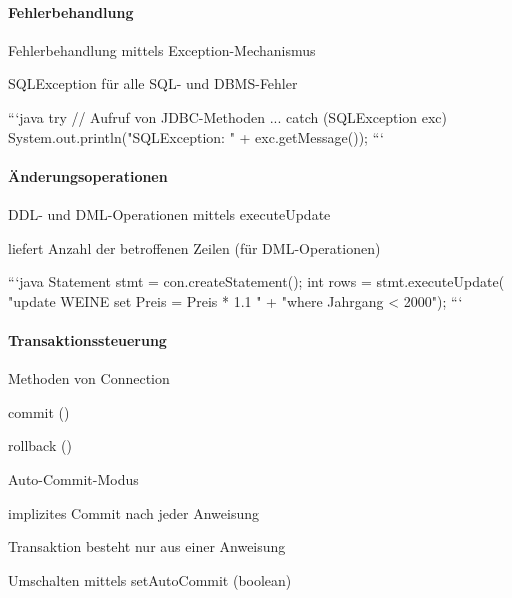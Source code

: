 \documentclass[a4paper]{article}
\begin{document}
\begin{multicols}{3}
    \paragraph{Fehlerbehandlung}
    \begin{itemize*}
        \item Fehlerbehandlung mittels Exception-Mechanismus
        \item SQLException für alle SQL- und DBMS-Fehler
    \end{itemize*}
    ```java
    try {
            // Aufruf von JDBC-Methoden
            ...
        } catch (SQLException exc) {
            System.out.println("SQLException: " +
            exc.getMessage());
        }
    ```

    \paragraph{Änderungsoperationen}
    \begin{itemize*}
        \item DDL- und DML-Operationen mittels executeUpdate
        \item liefert Anzahl der betroffenen Zeilen (für DML-Operationen)
    \end{itemize*}
    ```java
    Statement stmt = con.createStatement();
    int rows = stmt.executeUpdate(
    "update WEINE set Preis = Preis * 1.1 " +
    "where Jahrgang < 2000");
    ```

    \paragraph{Transaktionssteuerung}
    \begin{itemize*}
        \item Methoden von Connection
        \begin{itemize*}
            \item commit ()
            \item rollback ()
        \end{itemize*}
        \item Auto-Commit-Modus
        \begin{itemize*}
            \item implizites Commit nach jeder Anweisung
            \item Transaktion besteht nur aus einer Anweisung
            \item Umschalten mittels setAutoCommit (boolean)
        \end{itemize*}
    \end{itemize*}


\end{multicols}
\end{document}
